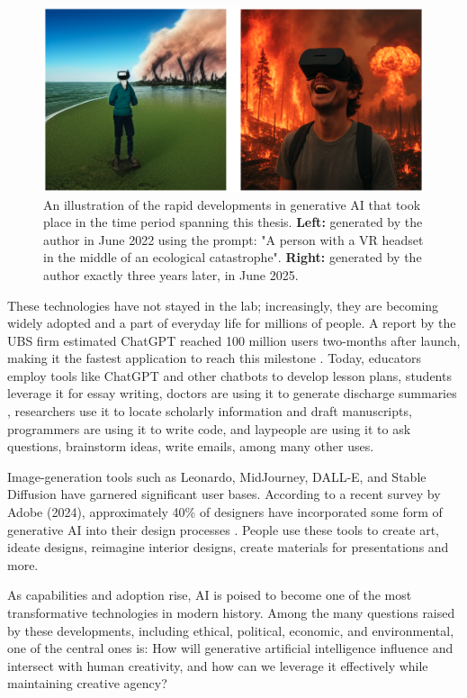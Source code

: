 \begin{figure}
    \centering
    \includegraphics[width=1\linewidth]{comparisonimages.png}
    \caption{An illustration of the rapid developments in generative AI that took place in the time period spanning this thesis. \textbf{Left:} generated by the author in June 2022 using the prompt: "A person with a VR headset in the middle of an ecological catastrophe". \textbf{Right:} generated by the author exactly three years later, in June 2025.}
    \label{fig:enter-label}
\end{figure}

These technologies have not stayed in the lab; increasingly, they are becoming widely adopted and a part of everyday life for millions of people. A report by the UBS firm estimated ChatGPT reached 100 million users two-months after launch, making it the fastest application to reach this milestone \cite{Hu2023-ie}. Today, educators employ tools like ChatGPT and other chatbots to develop lesson plans, students leverage it for essay writing, doctors are using it to generate discharge summaries \cite{Patel2023-fg}, researchers use it to locate scholarly information and draft manuscripts, programmers are using it to write code, and laypeople are using it to ask questions, brainstorm ideas, write emails, among many other uses. 

Image-generation tools such as Leonardo, MidJourney, DALL-E, and Stable Diffusion have garnered significant user bases. According to a recent survey by Adobe (2024), approximately 40\% of designers have incorporated some form of generative AI into their design processes \cite{Offerman2024-lf}. People use these tools to create art, ideate designs, reimagine interior designs, create materials for presentations and more. 

As capabilities and adoption rise, AI is poised to become one of the most transformative technologies in modern history. Among the many questions raised by these developments, including ethical, political, economic, and environmental, one of the central ones is: How will generative artificial intelligence influence and intersect with human creativity, and how can we leverage it effectively while maintaining creative agency?

